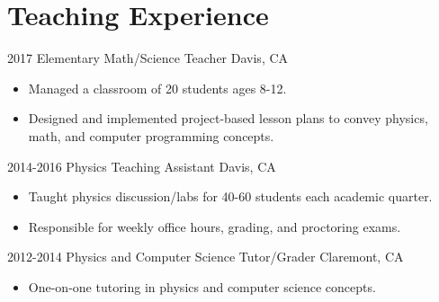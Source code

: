 \documentclass[]{cv-style}          %
\begin{document}

\section{Teaching Experience}
\begin{entrylist}

  \entry
      {2017}
      {Elementary Math/Science Teacher}
      {Davis, CA}
      {
        \begin{itemize}
        \item Managed a classroom of 20 students ages 8-12.
        \item Designed and implemented project-based lesson plans to convey physics, math, and computer programming concepts.\\
          \end{itemize}}
\entry
  {2014-2016}
  {Physics Teaching Assistant}
  {Davis, CA}
  {
  \begin{itemize}
    \item Taught physics discussion/labs for 40-60 students each academic quarter.
    \item Responsible for weekly office hours, grading, and proctoring exams.\\
  \end{itemize}}
\entry
  {2012-2014}
  {Physics and Computer Science Tutor/Grader}
  {Claremont, CA}
  {
  \begin{itemize}
    \item One-on-one tutoring in physics and computer science concepts.\\
  \end{itemize}}

\end{entrylist}
\end{document}
